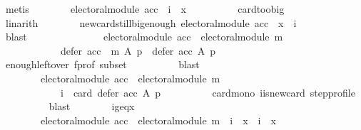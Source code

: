 \begin{isabellebody}
\ metis\isanewline
\ \ \ \ \ \ \isamarkupfalse%
\ {\isachardoublequoteopen}electoral{\isacharunderscore}{\kern0pt}module\ acc\ {\isasymlongrightarrow}\ i\ {\isasymge}\ x{\isachardoublequoteclose}\isanewline
\ \ \ \ \ \ \ \ \isamarkupfalse%
\ card{\isacharunderscore}{\kern0pt}too{\isacharunderscore}{\kern0pt}big\isanewline
\ \ \ \ \ \ \ \ \isamarkupfalse%
\ linarith\isanewline
\ \ \ \ \ \ \isamarkupfalse%
\ new{\isacharunderscore}{\kern0pt}card{\isacharunderscore}{\kern0pt}still{\isacharunderscore}{\kern0pt}big{\isacharunderscore}{\kern0pt}enough{\isacharcolon}{\kern0pt}\ {\isachardoublequoteopen}electoral{\isacharunderscore}{\kern0pt}module\ acc\ {\isasymlongrightarrow}\ x\ {\isasymle}\ i{\isachardoublequoteclose}\isanewline
\ \ \ \ \ \ \ \ \isamarkupfalse%
\ blast\isanewline
\ \ \ \ \ \ \isamarkupfalse%
\isanewline
\ \ \ \ \ \ \ \ {\isachardoublequoteopen}electoral{\isacharunderscore}{\kern0pt}module\ acc\ {\isasymand}\ electoral{\isacharunderscore}{\kern0pt}module\ m\ {\isasymlongrightarrow}\isanewline
\ \ \ \ \ \ \ \ \ \ \ \ defer\ {\isacharparenleft}{\kern0pt}acc\ {\isasymtriangleright}\ m{\isacharparenright}{\kern0pt}\ A\ p\ {\isasymsubseteq}\ defer\ acc\ A\ p{\isachardoublequoteclose}\isanewline
\ \ \ \ \ \ \ \ \isamarkupfalse%
\ enough{\isacharunderscore}{\kern0pt}leftover\ f{\isacharunderscore}{\kern0pt}prof\ subset\isanewline
\ \ \ \ \ \ \ \ \isamarkupfalse%
\ blast\isanewline
\ \ \ \ \ \ \isamarkupfalse%
\isanewline
\ \ \ \ \ \ \ \ {\isachardoublequoteopen}electoral{\isacharunderscore}{\kern0pt}module\ acc\ {\isasymand}\ electoral{\isacharunderscore}{\kern0pt}module\ m\ {\isasymlongrightarrow}\isanewline
\ \ \ \ \ \ \ \ \ \ \ \ i\ {\isasymle}\ card\ {\isacharparenleft}{\kern0pt}defer\ acc\ A\ p{\isacharparenright}{\kern0pt}{\isachardoublequoteclose}\isanewline
\ \ \ \ \ \ \ \ \isamarkupfalse%
\ card{\isacharunderscore}{\kern0pt}mono\ i{\isacharunderscore}{\kern0pt}is{\isacharunderscore}{\kern0pt}new{\isacharunderscore}{\kern0pt}card\ step{\isacharunderscore}{\kern0pt}profile\isanewline
\ \ \ \ \ \ \ \ \isamarkupfalse%
\ blast\isanewline
\ \ \ \ \ \ \isamarkupfalse%
\ i{\isacharunderscore}{\kern0pt}geq{\isacharunderscore}{\kern0pt}x{\isacharcolon}{\kern0pt}\isanewline
\ \ \ \ \ \ \ \ {\isachardoublequoteopen}electoral{\isacharunderscore}{\kern0pt}module\ acc\ {\isasymand}\ electoral{\isacharunderscore}{\kern0pt}module\ m\ {\isasymlongrightarrow}\ {\isacharparenleft}{\kern0pt}i\ {\isacharequal}{\kern0pt}\ x\ {\isasymor}\ i\ {\isachargreater}{\kern0pt}\ x{\isacharparenright}{\kern0pt}{\isachardoublequoteclose}\isanewline

\end{isabellebody}
